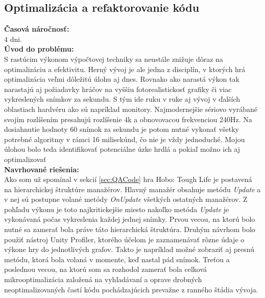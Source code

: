 \documentclass[slovak, bachelorpractice]{diploma}
\begin{document}
\subsection{Optimalizácia a refaktorovanie kódu}
\label{sec:optim}
\textbf{Časová náročnosť:} \\ 4 dni.\\
\textbf{Úvod do problému:} \\ S rastúcim výkonom výpočtovej techniky sa neustále znižuje dôraz na optimalizáciu a efektivitu. Herný vývoj je ale jedna z disciplín, v ktorých hrá optimalizácia veľmi dôležitú úlohu aj dnes. Rovnako ako narastá výkon tak narastajú aj požiadavky hráčov na vyššiu fotorealistickosť grafiky či viac vykreslených snímkov za sekundu. S tým ide ruku v ruke aj vývoj v ďalších oblastiach hardvéru ako sú napríklad monitory. Najmodernejšie sériovo vyrábané svojím rozlíšením presahujú rozlíšenie 4k a obnovovacou frekvenciou 240Hz. Na dosiahnutie hodnoty 60 snímok za sekundu je potom nutné vykonať všetky potrebné algoritmy v rámci 16 milisekúnd, čo nie je vždy jednoduché. Mojou úlohou bolo teda identifikovať potenciálne úzke hrdlá a pokiaľ možno ich aj optimalizovať \\
\textbf{Navrhované riešenia:} \\ Ako som už spomínal v sekcií \ref{sec:QACode} hra Hobo: Tough Life je postavená na hierarchickej štruktúre manažérov. Hlavný manažér obsahuje metódu \textit{Update} a v nej sú postupne volané metódy \textit{OnUpdate} všetkých ostatných manažérov. Z pohľadu výkonu je toto najkritickejšie miesto nakoľko metóda \textit{Update} je vykonávaná počas vykreslenia každej jednej snímky. Prvou vecou, na ktorú bolo nutné sa zamerať bola práve táto hierarchická štruktúra. Druhým návrhom bolo použiť nástroj Unity Profiler, ktorého účelom je zaznamenávať rôzne údaje o výkone hry do jednotlivých grafov. Takto je napríklad možné zobraziť aj presnú metódu, ktorá bola volaná v momente, keď nastal pád snímok. Treťou a poslednou vecou, na ktorú som sa rozhodol zamerať bola celková mikrooptimalizácia založená na vyhľadávaní a oprave drobných neoptimalizovaných častí kódu pochádzajúcich prevažne z ranného štádia vývoja.  \\
\end{document}
